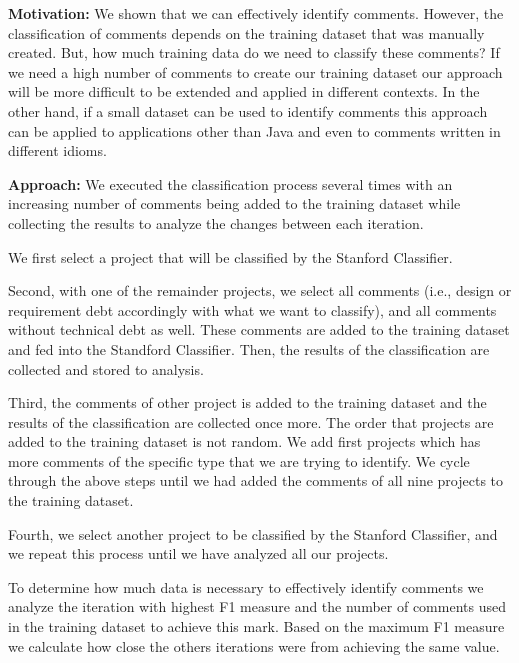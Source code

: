\vspace{3mm}
\noindent\rqiii
\vspace{3mm}

\noindent \textbf{Motivation:} We shown that we can effectively identify \SATD comments. However, the classification of \SATD comments depends on the training dataset that was manually created. But, how much training data do we need to classify these comments? If we need a high number of comments to create our training dataset our approach will be more difficult to be extended and applied in different contexts. In the other hand, if a small dataset can be used to identify \SATD comments this approach can be applied to applications other than Java and even to comments written in different idioms. 

\vspace{1mm}
\noindent \textbf{Approach:} We executed the classification process several times with an increasing number of comments being added to the training dataset while collecting the results to analyze the changes between each iteration. 

We first select a project that will be classified by the Stanford Classifier. 

Second, with one of the remainder projects, we select all \SATD comments (i.e., design or requirement debt accordingly with what we want to classify), and all comments without technical debt as well. These comments are added to the training dataset and fed into the Standford Classifier. Then, the results of the classification are collected and stored to analysis. 

Third, the comments of other project is added to the training dataset and the results of the classification are collected once more. The order that projects are added to the training dataset is not random. We add first projects which has more \SATD comments of the specific type that we are trying to identify. We cycle through the above steps until we had added the comments of all nine projects to the training dataset. 

Fourth, we select another project to be classified by the Stanford Classifier, and we repeat this process until we have analyzed all our projects. 
 
To determine how much data is necessary to effectively identify \SATD comments we analyze the iteration with highest F1 measure and the number of comments used in the training dataset to achieve this mark. Based on the maximum F1 measure we calculate how close the others iterations were from achieving the same value. 

